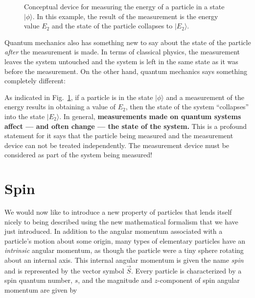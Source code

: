 \begin{figure}
\begin{center}
\caption{Conceptual device for measuring the energy of a particle in a state $|\mbox{$\phi$}\rangle$. In this example, the result of the measurement is the energy value $E_2$ and the state of the particle collapses to $|\mbox{$E_2$}\rangle$.}
\label{fig:Measurement}
\end{center}
\end{figure}

Quantum mechanics also has something new to say about the state of the
particle \emph{after} the measurement is made.  In terms of classical
physics, the measurement leaves the system untouched and the system is
left in the same state as it was before the measurement.  On the other
hand, quantum mechanics says something completely different:



As indicated in Fig.~\ref{fig:Measurement}, if a particle is in
the state $|\mbox{$\phi$}\rangle$ and a measurement of the energy
results in obtaining a value of $E_2$, then the state of the system
``collapses'' into the state $|\mbox{$E_2$}\rangle$.  In general, {\bf
measurements made on quantum systems affect --- and often change --- the
state of the system.}  This is a profound statement for it says that the
particle being measured and the measurement device can not be treated
independently. The measurement device must be considered as part of the
system being measured!

\section{Spin}

We would now like to introduce a new property of particles that lends
itself nicely to being described using the new mathematical formalism
that we have just introduced.  In addition to the angular momentum
associated with a particle's motion about some origin, many types
of elementary particles have an \textit{intrinsic} angular momentum,
as though the particle were a tiny sphere rotating about an internal
axis.  This internal angular momentum is given the name {\it spin\/}
and is represented by the vector symbol $\vec{S}$.  Every particle is
characterized by a spin quantum number, $s$, and 
the magnitude and $z$-component of spin angular momentum are given by

